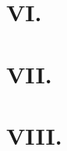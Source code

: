 \documentclass[a4paper]{article}
\begin{document}
\section*{VI. }

\section*{VII. }


\section*{VIII. }




\end{document}
